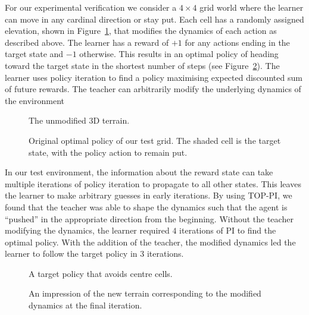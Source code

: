 For our experimental verification we consider a $4 \times 4$ grid world where the learner can move in any cardinal direction or stay put.  Each cell has a randomly assigned elevation, shown in Figure~\ref{probalt}, that modifies the dynamics of each action as described above.  The learner has a reward of $+1$ for any actions ending in the target state and $-1$ otherwise.  This results in an optimal policy of heading toward the target state in the shortest number of steps (see Figure~\ref{prevopt}).  The learner uses policy iteration to find a policy maximising expected discounted sum of future rewards.  The teacher can arbitrarily modify the underlying dynamics of the environment

\begin{figure}[ht]
\centerline{}
\caption{\label{probalt}The unmodified 3D terrain.}
\end{figure}

\begin{figure}[ht]
\centerline{}
\caption{\label{prevopt}Original optimal policy of our test grid.  The shaded cell is the target state, with the policy action to remain put.}
\end{figure}

In our test environment, the information about the reward state can take multiple iterations of policy iteration to propagate to all other states.  This leaves the learner to make arbitrary guesses in early iterations.  By using TOP-PI, we found that the teacher was able to shape the dynamics such that the agent is ``pushed'' in the appropriate direction from the beginning.  Without the teacher modifying the dynamics, the learner required $4$ iterations of PI to find the optimal policy.  With the addition of the teacher, the modified dynamics led the learner to follow the target policy in $3$ iterations.

\begin{figure}[ht]
\centerline{}
\caption{\label{newopt}A target policy that avoids centre cells.}
\end{figure}

\begin{figure}[ht]
\centerline{}
\caption{\label{newalt}An impression of the new terrain corresponding to the modified dynamics at the final iteration.}
\end{figure}

